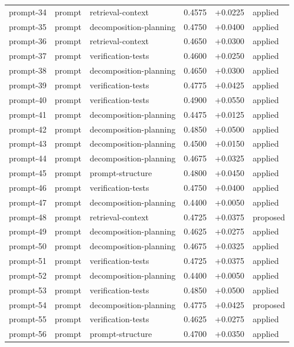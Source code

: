 \begin{center}
\begin{longtable}{llp{5.2cm}rrl}
prompt-34 & prompt & retrieval-context & 0.4575 & +0.0225 & applied \\
prompt-35 & prompt & decomposition-planning & 0.4750 & +0.0400 & applied \\
prompt-36 & prompt & retrieval-context & 0.4650 & +0.0300 & applied \\
prompt-37 & prompt & verification-tests & 0.4600 & +0.0250 & applied \\
prompt-38 & prompt & decomposition-planning & 0.4650 & +0.0300 & applied \\
prompt-39 & prompt & verification-tests & 0.4775 & +0.0425 & applied \\
prompt-40 & prompt & verification-tests & 0.4900 & +0.0550 & applied \\
prompt-41 & prompt & decomposition-planning & 0.4475 & +0.0125 & applied \\
prompt-42 & prompt & decomposition-planning & 0.4850 & +0.0500 & applied \\
prompt-43 & prompt & decomposition-planning & 0.4500 & +0.0150 & applied \\
prompt-44 & prompt & decomposition-planning & 0.4675 & +0.0325 & applied \\
prompt-45 & prompt & prompt-structure & 0.4800 & +0.0450 & applied \\
prompt-46 & prompt & verification-tests & 0.4750 & +0.0400 & applied \\
prompt-47 & prompt & decomposition-planning & 0.4400 & +0.0050 & applied \\
prompt-48 & prompt & retrieval-context & 0.4725 & +0.0375 & proposed \\
prompt-49 & prompt & decomposition-planning & 0.4625 & +0.0275 & applied \\
prompt-50 & prompt & decomposition-planning & 0.4675 & +0.0325 & applied \\
prompt-51 & prompt & verification-tests & 0.4725 & +0.0375 & applied \\
prompt-52 & prompt & decomposition-planning & 0.4400 & +0.0050 & applied \\
prompt-53 & prompt & verification-tests & 0.4850 & +0.0500 & applied \\
prompt-54 & prompt & decomposition-planning & 0.4775 & +0.0425 & proposed \\
prompt-55 & prompt & verification-tests & 0.4625 & +0.0275 & applied \\
prompt-56 & prompt & prompt-structure & 0.4700 & +0.0350 & applied \\

\end{longtable}
\end{center}
